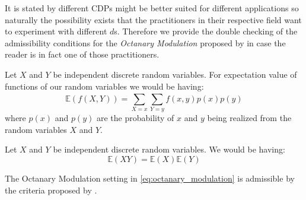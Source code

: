 
\begin{Rem}
It is stated by \cite{ECXLMS2013} different \acl*{CDP}s might be better suited for different applications so naturally 
the possibility exists that the practitioners in their respective field want to experiment with different $d$s. Therefore 
we provide the double checking of the admissibility conditions for the \emph{Octanary Modulation} proposed by \cite{Candes2014} 
in case the reader is in fact one of those practitioners.
\end{Rem}

\begin{Thm}\label{theorem:expectation_general}
  Let $X$ and $Y$ be independent discrete random variables. For expectation value of functions of our random variables we would be having:
\begin{equation}
  \mathbb{E}(f(X,Y)) = \sum_{X=x}^{}\sum_{Y=y}^{}f(x,y)p(x)p(y)
\end{equation}
  where $p(x)$ and $p(y)$ are the probability of $x$ and $y$ being realized from the random variables $X$ and $Y$.
\end{Thm}
\begin{Lem}\label{lemma:expectation_multiplication}
Let $X$ and $Y$ be independent discrete random variables. We would be having:
\begin{equation}
  \mathbb{E}(XY) = \mathbb{E}(X)\mathbb{E}(Y)
\end{equation}
\end{Lem}

\begin{Prop}
	The Octanary Modulation setting in \cref{eq:octanary_modulation} is admissible by the criteria proposed by \cite{Candes2014}. 
\end{Prop}

